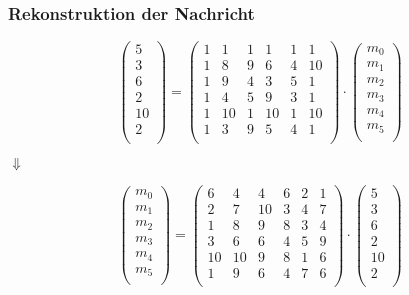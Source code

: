 \documentclass[11pt,aspectratio=169]{beamer}
\begin{document}
	\begin{frame}
		\frametitle{Rekonstruktion der Nachricht}
		
		\[
		\begin{pmatrix}
			5 \\ 3 \\ 6 \\ 2 \\ 10 \\ 2 \\
		\end{pmatrix}
		=
		\begin{pmatrix}
			1&  1& 1&  1& 1&  1\\
			1&  8& 9&  6& 4& 10\\
			1&  9& 4&  3& 5&  1\\
			1&  4& 5&  9& 3&  1\\
			1& 10& 1& 10& 1& 10\\
			1&  3& 9&  5& 4&  1\\
		\end{pmatrix}
		\cdot
		\begin{pmatrix}
			m_0 \\ m_1 \\ m_2 \\ m_3 \\ m_4 \\ m_5 \\
		\end{pmatrix}
		\]
		
		\begin{center}
			$\Downarrow$
		\end{center}
		\[
		\begin{pmatrix}
			m_0 \\ m_1 \\ m_2 \\ m_3 \\ m_4 \\ m_5 \\
		\end{pmatrix}
		=
		\begin{pmatrix}
			 6&  4&  4&  6& 2&  1\\
			 2&  7& 10&  3& 4&  7\\
			 1&  8&  9&  8& 3&  4\\
			 3&  6&  6&  4& 5&  9\\
			10& 10&  9&  8& 1&  6\\
			 1&  9&  6&  4& 7&  6\\
		\end{pmatrix}
		\cdot
		\begin{pmatrix}
			5 \\ 3 \\ 6 \\ 2 \\ 10 \\ 2 \\
		\end{pmatrix}
		\]
		
	\end{frame}
\end{document}
